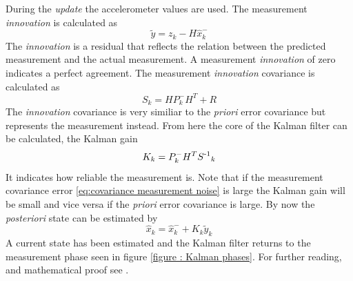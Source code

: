 \documentclass[a4paper,11pt]{kth-mag}
\begin{document}
During the \textit{update} the accelerometer values are used. The measurement \textit{innovation} is calculated as
\begin{equation}
\tilde{y} = z_k - H\hat{x}^-_k
\end{equation}
The \textit{innovation} is a residual that reflects the relation between the predicted measurement and the actual measurement. A measurement \textit{innovation} of zero indicates a perfect agreement.
The measurement \textit{innovation} covariance is calculated as
\begin{equation}
S_k = HP^-_kH^T + R
\end{equation}
The \textit{innovation} covariance is very similiar to the \textit{priori} error covariance but represents the measurement instead. From here the core of the Kalman filter can be calculated, the Kalman gain
\begin{equation}
K_k = P^-_kH^TS\textsuperscript{-1}_k
\end{equation}
It indicates how reliable the measurement is. Note that if the measurement covariance error \eqref{eq:covariance measurement noise} is large the Kalman gain will be small and vice versa if the \textit{priori} error covariance is large.
By now the \textit{posteriori} state can be estimated by
\begin{equation}
\hat{x}_k = \hat{x}^-_k + K_k\tilde{y}_k
\end{equation}
A current state has been estimated and the Kalman filter returns to the measurement phase seen in figure \ref{figure : Kalman phases}.
For further reading, and mathematical proof see \cite{Kalmanintro}.
\end{document}
